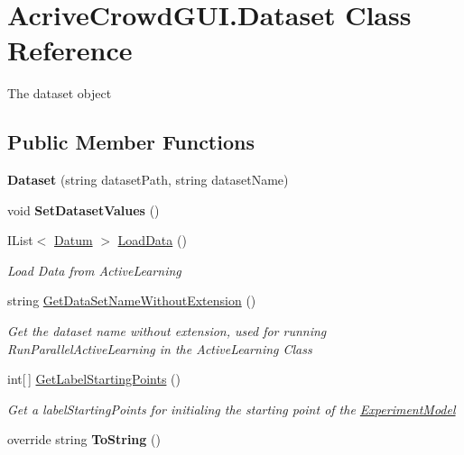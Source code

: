 \hypertarget{class_acrive_crowd_g_u_i_1_1_dataset}{}\section{Acrive\+Crowd\+G\+U\+I.\+Dataset Class Reference}
\label{class_acrive_crowd_g_u_i_1_1_dataset}


The dataset object  


\subsection*{Public Member Functions}
\begin{DoxyCompactItemize}
\item 
\hypertarget{class_acrive_crowd_g_u_i_1_1_dataset_aa844383c84c7234b6ccb92c2e7b47855}{}{\bfseries Dataset} (string dataset\+Path, string dataset\+Name)\label{class_acrive_crowd_g_u_i_1_1_dataset_aa844383c84c7234b6ccb92c2e7b47855}

\item 
\hypertarget{class_acrive_crowd_g_u_i_1_1_dataset_a7684107c56a87696f52bff99481b7224}{}void {\bfseries Set\+Dataset\+Values} ()\label{class_acrive_crowd_g_u_i_1_1_dataset_a7684107c56a87696f52bff99481b7224}

\item 
I\+List$<$ \hyperlink{class_crowdsourcing_models_1_1_datum}{Datum} $>$ \hyperlink{class_acrive_crowd_g_u_i_1_1_dataset_ad7e9131a8ec937930d0bdd38789e116a}{Load\+Data} ()
\begin{DoxyCompactList}\small\item\em Load Data from Active\+Learning \end{DoxyCompactList}\item 
string \hyperlink{class_acrive_crowd_g_u_i_1_1_dataset_a562236dd794b35311b60cc873db244b3}{Get\+Data\+Set\+Name\+Without\+Extension} ()
\begin{DoxyCompactList}\small\item\em Get the dataset name without extension, used for running Run\+Parallel\+Active\+Learning in the Active\+Learning Class \end{DoxyCompactList}\item 
int\mbox{[}$\,$\mbox{]} \hyperlink{class_acrive_crowd_g_u_i_1_1_dataset_a40450b38294ea53158ed5b0ab78005b0}{Get\+Label\+Starting\+Points} ()
\begin{DoxyCompactList}\small\item\em Get a label\+Starting\+Points for initialing the starting point of the \hyperlink{class_acrive_crowd_g_u_i_1_1_experiment_model}{Experiment\+Model} \end{DoxyCompactList}\item 
\hypertarget{class_acrive_crowd_g_u_i_1_1_dataset_adfb9d461e0f2f483aee74fe4ff6b112e}{}override string {\bfseries To\+String} ()\label{class_acrive_crowd_g_u_i_1_1_dataset_adfb9d461e0f2f483aee74fe4ff6b112e}

\end{DoxyCompactItemize}
